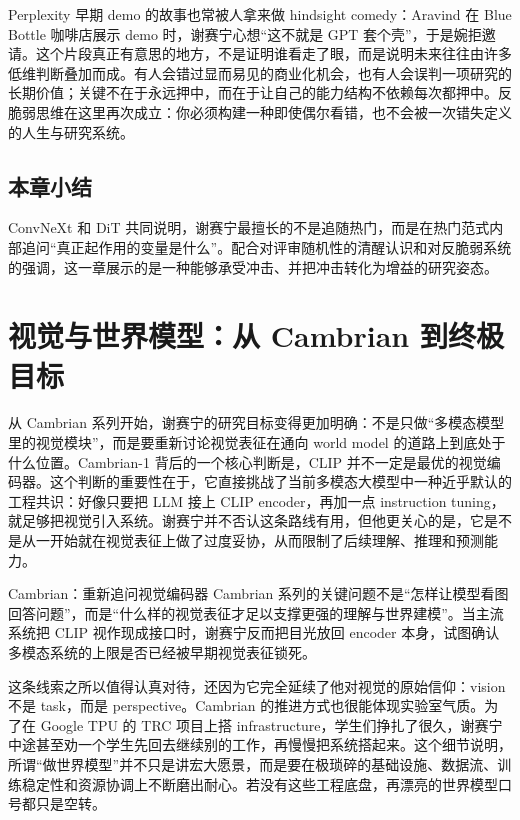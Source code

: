 \documentclass[a4paper,12pt]{article}
\begin{document}
Perplexity 早期 demo 的故事也常被人拿来做 hindsight comedy：Aravind 在 Blue Bottle 咖啡店展示 demo 时，谢赛宁心想“这不就是 GPT 套个壳”，于是婉拒邀请。这个片段真正有意思的地方，不是证明谁看走了眼，而是说明未来往往由许多低维判断叠加而成。有人会错过显而易见的商业化机会，也有人会误判一项研究的长期价值；关键不在于永远押中，而在于让自己的能力结构不依赖每次都押中。反脆弱思维在这里再次成立：你必须构建一种即使偶尔看错，也不会被一次错失定义的人生与研究系统。

\subsection{本章小结}

ConvNeXt 和 DiT 共同说明，谢赛宁最擅长的不是追随热门，而是在热门范式内部追问“真正起作用的变量是什么”。配合对评审随机性的清醒认识和对反脆弱系统的强调，这一章展示的是一种能够承受冲击、并把冲击转化为增益的研究姿态。

\section{视觉与世界模型：从 Cambrian 到终极目标}

从 Cambrian 系列开始，谢赛宁的研究目标变得更加明确：不是只做“多模态模型里的视觉模块”，而是要重新讨论视觉表征在通向 world model 的道路上到底处于什么位置。Cambrian-1 背后的一个核心判断是，CLIP 并不一定是最优的视觉编码器。这个判断的重要性在于，它直接挑战了当前多模态大模型中一种近乎默认的工程共识：好像只要把 LLM 接上 CLIP encoder，再加一点 instruction tuning，就足够把视觉引入系统。谢赛宁并不否认这条路线有用，但他更关心的是，它是不是从一开始就在视觉表征上做了过度妥协，从而限制了后续理解、推理和预测能力。

\begin{knowledgebox}{Cambrian：重新追问视觉编码器}
Cambrian 系列的关键问题不是“怎样让模型看图回答问题”，而是“什么样的视觉表征才足以支撑更强的理解与世界建模”。当主流系统把 CLIP 视作现成接口时，谢赛宁反而把目光放回 encoder 本身，试图确认多模态系统的上限是否已经被早期视觉表征锁死。
\end{knowledgebox}

这条线索之所以值得认真对待，还因为它完全延续了他对视觉的原始信仰：vision 不是 task，而是 perspective。Cambrian 的推进方式也很能体现实验室气质。为了在 Google TPU 的 TRC 项目上搭 infrastructure，学生们挣扎了很久，谢赛宁中途甚至劝一个学生先回去继续别的工作，再慢慢把系统搭起来。这个细节说明，所谓“做世界模型”并不只是讲宏大愿景，而是要在极琐碎的基础设施、数据流、训练稳定性和资源协调上不断磨出耐心。若没有这些工程底盘，再漂亮的世界模型口号都只是空转。
\end{document}
